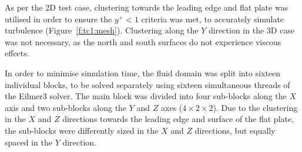 %
As per the 2D test case, clustering towards the leading edge and flat plate was utilised in order to ensure the $y^+<1$ criteria was met, to accurately simulate turbulence (Figure~\ref{f:tc1:mesh}). Clustering along the $Y$ direction in the 3D case was not necessary, as the north and south surfaces do not experience viscous effects.

In order to minimise simulation time, the fluid domain was split into sixteen individual blocks, to be solved separately using sixteen simultaneous threads of the Eilmer3 solver. The main block was divided into four sub-blocks along the $X$ axis and two sub-blocks along the $Y$ and $Z$ axes ($4\times2\times2$). Due to the clustering in the $X$ and $Z$ directions towards the leading edge and surface of the flat plate, the sub-blocks were differently sized in the $X$ and $Z$ directions, but equally spaced in the $Y$ direction.

